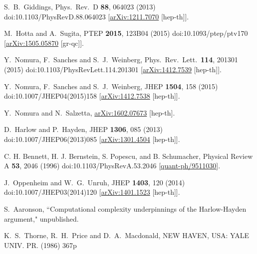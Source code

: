 \documentclass[a4paper,11pt]{article}
\theoremstyle{definition}
\begin{document}
\begin{thebibliography}{1}
  S.~B.~Giddings,
  Phys.\ Rev.\ D {\bf 88}, 064023 (2013)
  doi:10.1103/PhysRevD.88.064023
  [\href{https://arxiv.org/abs/1211.7070}{arXiv:1211.7070} [hep-th]].
 

  M.~Hotta and A.~Sugita,
  PTEP {\bf 2015}, 123B04 (2015)
  doi:10.1093/ptep/ptv170
  [\href{https://arxiv.org/abs/1505.05870}{arXiv:1505.05870} [gr-qc]].

  Y.~Nomura, F.~Sanches and S.~J.~Weinberg,
  Phys.\ Rev.\ Lett.\  {\bf 114}, 201301 (2015)
  doi:10.1103/PhysRevLett.114.201301
  [\href{https://arxiv.org/abs/1412.7539}{arXiv:1412.7539} [hep-th]].

  Y.~Nomura, F.~Sanches and S.~J.~Weinberg,
  JHEP {\bf 1504}, 158 (2015)
  doi:10.1007/JHEP04(2015)158
  [\href{https://arxiv.org/abs/1412.7538}{arXiv:1412.7538} [hep-th]].

  Y.~Nomura and N.~Salzetta,
  \href{https://arxiv.org/abs/1602.07673}{arXiv:1602.07673} [hep-th].
  
  D.~Harlow and P.~Hayden,
  JHEP {\bf 1306}, 085 (2013)
  doi:10.1007/JHEP06(2013)085
  [\href{https://arxiv.org/abs/1301.4504}{arXiv:1301.4504} [hep-th]].


  C. H. Bennett, H. J. Bernstein, S. Popescu, and B. Schumacher,
  Physical Review A {\bf 53}, 2046 (1996)
  doi:10.1103/PhysRevA.53.2046
  [\href{https://arxiv.org/abs/quant-ph/9511030}{quant-ph/9511030}].


  J.~Oppenheim and W.~G.~Unruh,
  JHEP {\bf 1403}, 120 (2014)
  doi:10.1007/JHEP03(2014)120
  [\href{https://arxiv.org/abs/1401.1523}{arXiv:1401.1523} [hep-th]].


  S.~Aaronson, ``Computational complexity underpinnings of the Harlow-Hayden argument," unpublished.


  K.~S.~Thorne, R.~H.~Price and D.~A.~Macdonald,
  NEW HAVEN, USA: YALE UNIV. PR. (1986) 367p


\end{thebibliography}
\end{document}
